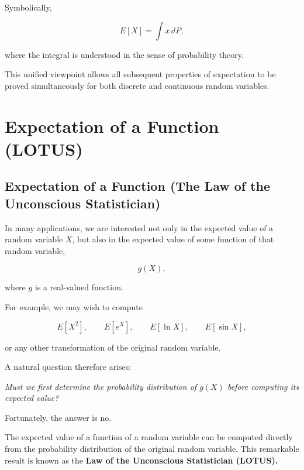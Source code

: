 \documentclass[11pt]{article}
\begin{document}
\begin{mdframed}[
		linewidth=0.8pt,
		roundcorner=6pt,
		backgroundcolor=gray!5,
		linecolor=gray!60,
		innertopmargin=10pt,
		innerbottommargin=10pt,
		innerleftmargin=10pt,
		innerrightmargin=10pt
		]
		Symbolically,
		
		\[
		\boxed{
			E[X]
			=
			\int x\,dP,
		}
		\]
		
		where the integral is understood in the sense of probability theory.
		
		This unified viewpoint allows all subsequent properties of expectation to be
		proved simultaneously for both discrete and continuous random variables.
		
	\end{mdframed}
	
	
	\section{Expectation of a Function (LOTUS)}
	\begin{mdframed}[
		linewidth=0.8pt,
		roundcorner=6pt,
		backgroundcolor=gray!5,
		linecolor=gray!60,
		innertopmargin=10pt,
		innerbottommargin=10pt,
		innerleftmargin=10pt,
		innerrightmargin=10pt
		]
		
		\subsection*{Expectation of a Function (The Law of the Unconscious Statistician)}
		
		In many applications, we are interested not only in the expected value of a
		random variable $X$, but also in the expected value of some function of that
		random variable,
		
		\[
		g(X),
		\]
		
		where $g$ is a real-valued function.
		
		For example, we may wish to compute
		
		\[
		E[X^2],
		\qquad
		E[e^X],
		\qquad
		E[\ln X],
		\qquad
		E[\sin X],
		\]
		
		or any other transformation of the original random variable.
		
		A natural question therefore arises:
		
		\begin{center}
			\emph{Must we first determine the probability distribution of $g(X)$ before
				computing its expected value?}
		\end{center}
		
		Fortunately, the answer is no.
		
		The expected value of a function of a random variable can be computed
		directly from the probability distribution of the original random variable.
		This remarkable result is known as the \textbf{Law of the Unconscious
			Statistician (LOTUS).}
		

\end{mdframed}
\end{document}
